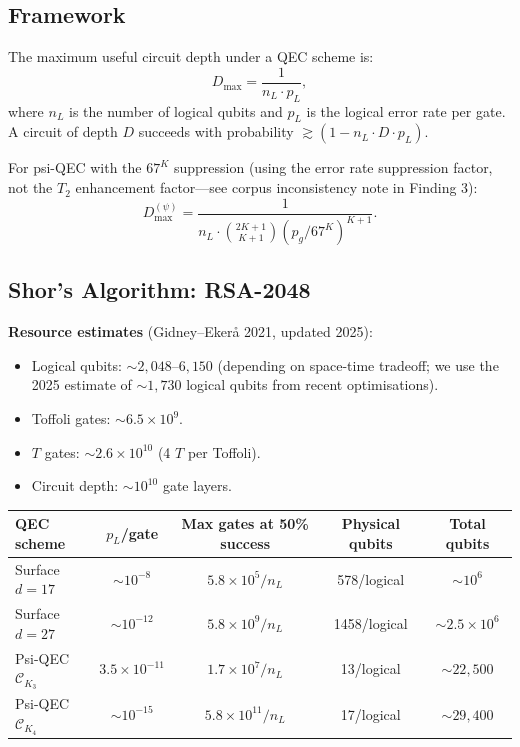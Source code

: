 \documentclass[11pt]{article}
\theoremstyle{definition}
\theoremstyle{remark}
\newcommand{\CK}{\mathcal{C}_K}
\newcommand{\ee}[1]{\times 10^{#1}}
\begin{document}
\subsection{Framework}
\label{sec:depth-framework}

The maximum useful circuit depth under a QEC scheme is:
\begin{equation}
  D_{\max} = \frac{1}{n_L \cdot p_L},
  \label{eq:dmax-general}
\end{equation}
where $n_L$ is the number of logical qubits and $p_L$ is the logical
error rate per gate.  A circuit of depth $D$ succeeds with probability
$\gtrsim (1 - n_L \cdot D \cdot p_L)$.

For psi-QEC with the $67^K$ suppression (using the error rate
suppression factor, not the $T_2$ enhancement factor---see corpus
inconsistency note in Finding 3):
\begin{equation}
  D_{\max}^{(\psi)} = \frac{1}{n_L \cdot \binom{2K+1}{K+1}
  (p_g/67^K)^{K+1}}.
  \label{eq:dmax-psi}
\end{equation}

\subsection{Shor's Algorithm: RSA-2048}
\label{sec:shor-2048}

\textbf{Resource estimates} (Gidney--Eker\aa{} 2021, updated 2025):
\begin{itemize}[nosep]
  \item Logical qubits: $\sim 2{,}048$--$6{,}150$ (depending on space-time
    tradeoff; we use the 2025 estimate of $\sim 1{,}730$ logical qubits
    from recent optimisations).
  \item Toffoli gates: $\sim 6.5\ee{9}$.
  \item $T$ gates: $\sim 2.6\ee{10}$ (4 $T$ per Toffoli).
  \item Circuit depth: $\sim 10^{10}$ gate layers.
\end{itemize}

\begin{center}
\begin{tabular}{@{}lcccc@{}}
\toprule
QEC scheme & $p_L$/gate & Max gates at 50\% success
  & Physical qubits & Total qubits \\
\midrule
Surface $d=17$ & $\sim 10^{-8}$ & $5.8\ee{5}/n_L$ & 578/logical
  & $\sim 10^6$ \\
Surface $d=27$ & $\sim 10^{-12}$ & $5.8\ee{9}/n_L$ & 1458/logical
  & $\sim 2.5\ee{6}$ \\
Psi-QEC $\CK_3$ & $3.5\ee{-11}$ & $1.7\ee{7}/n_L$ & 13/logical
  & $\sim 22{,}500$ \\
Psi-QEC $\CK_4$ & $\sim 10^{-15}$ & $5.8\ee{11}/n_L$ & 17/logical
  & $\sim 29{,}400$ \\
\bottomrule
\end{tabular}
\end{center}
\end{document}
